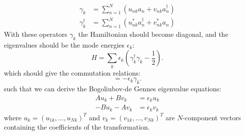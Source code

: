 \begin{align}
    \gamma_k      &= \sum_{n=1}^N (u_{nk} a_n + v_{nk} a_n^\dag)\\
    \gamma_k^\dag &= \sum_{n=1}^N (u_{nk}^* a_n^\dag + v_{nk}^* a_n)
\end{align}
With these operators $\gamma_k$ the Hamiltonian should become diagonal, and the eigenvalues should be the mode energies $\epsilon_k$:
\begin{equation}
    H = \sum_k \epsilon_k \left(\gamma_k^\dagger \gamma_k - \frac{1}{2}\right).
\end{equation}
which should give the commutation relations:
\begin{equation}
    [H, \gamma_k] = -\epsilon_k \gamma_k.
\end{equation}
such that we can derive the Bogoliubov-de Gennes eigenvalue equations:
\begin{align}
    A u_k + B v_k  &= \epsilon_k u_k \label{eq:BdG_eq1}\\
    -B u_k - A v_k &= \epsilon_k v_k \label{eq:BdG_eq2}
\end{align}
where $u_k = (u_{1k}, \dots, u_{Nk})^T$ and $v_k = (v_{1k}, \dots, v_{Nk})^T$ are $N$-component vectors containing the coefficients of the transformation.

